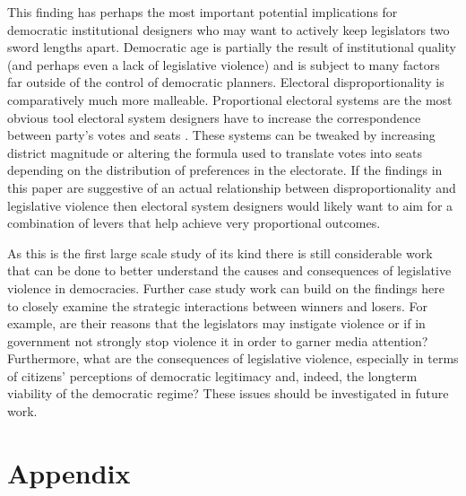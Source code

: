 \documentclass[a4paper]{article}\usepackage{graphicx, color}
\begin{document}
This finding has perhaps the most important potential implications for democratic institutional designers who may want to actively keep legislators two sword lengths apart. Democratic age is partially the result of institutional quality (and perhaps even a lack of legislative violence) and is subject to many factors far outside of the control of democratic planners. Electoral disproportionality is comparatively much more malleable. Proportional electoral systems are the most obvious tool electoral system designers have to increase the correspondence between party's votes and seats \citep{Carey2011}. These systems can be tweaked by increasing district magnitude or altering the formula used to translate votes into seats depending on the distribution of preferences in the electorate. If the findings in this paper are suggestive of an actual relationship between disproportionality and legislative violence then electoral system designers would likely want to aim for a combination of levers that help achieve very proportional outcomes. 

As this is the first large scale study of its kind there is still considerable work that can be done to better understand the causes and consequences of legislative violence in democracies. Further case study work can build on the findings here to closely examine the strategic interactions between winners and losers. For example, are their reasons that the legislators may instigate violence or if in government not strongly stop violence it in order to garner media attention? Furthermore, what are the consequences of legislative violence, especially in terms of citizens' perceptions of democratic legitimacy and, indeed, the longterm viability of the democratic regime? These issues should be investigated in future work. 





\theendnotes


\clearpage
\section*{Appendix}
\end{document}

